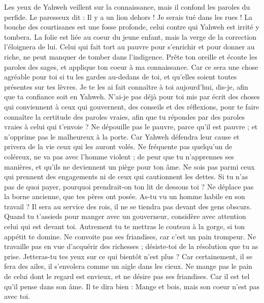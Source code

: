 \begin{multicols}{2}
Les yeux de Yahweh veillent sur la connaissance, mais il confond les paroles du perfide.
Le paresseux dit : Il y a un lion dehors ! Je serais tué dans les rues !
La bouche des courtisanes est une fosse profonde, celui contre qui Yahweh est irrité y tombera.
La folie est liée au coeur du jeune enfant, mais la verge de la correction l'éloignera de lui.
Celui qui fait tort au pauvre pour s'enrichir et pour donner au riche, ne peut manquer de tomber dans l'indigence.
Prête ton oreille et écoute les paroles des sages, et applique ton coeur à ma connaissance.
Car ce sera une chose agréable pour toi si tu les gardes au-dedans de toi, et qu'elles soient toutes présentes sur tes lèvres.
Je te les ai fait connaître à toi aujourd'hui, dis-je, afin que ta confiance soit en Yahweh.
N'ai-je pas déjà pour toi mis par écrit des choses qui conviennent à ceux qui gouvernent, des conseils et des réflexions,
pour te faire connaître la certitude des paroles vraies, afin que tu répondes par des paroles vraies à celui qui t'envoie ?
Ne dépouille pas le pauvre, parce qu'il est pauvre ; et n'opprime pas le malheureux à la porte.
Car Yahweh défendra leur cause et privera de la vie ceux qui les auront volés.
Ne fréquente pas quelqu'un de coléreux, ne va pas avec l'homme violent ;
de peur que tu n'apprennes ses manières, et qu'ils ne deviennent un piège pour ton âme.
Ne sois pas parmi ceux qui prennent des engagements ni de ceux qui cautionnent les dettes.
Si tu n'as pas de quoi payer, pourquoi prendrait-on ton lit de dessous toi ?
Ne déplace pas la borne ancienne, que tes pères ont posée.
As-tu vu un homme habile en son travail ? Il sera au service des rois, il ne se tiendra pas devant des gens obscurs.
\VerseOne{}Quand tu t'assieds pour manger avec un gouverneur, considère avec attention celui qui est devant toi.
Autrement tu te mettras le couteau à la gorge, si ton appétit te domine.
Ne convoite pas ses friandises, car c'est un pain trompeur.
Ne travaille pas en vue d'acquérir des richesses ; désiste-toi de la résolution que tu as prise.
Jetteras-tu tes yeux sur ce qui bientôt n'est plus ? Car certainement, il se fera des ailes, il s'envolera comme un aigle dans les cieux.
Ne mange pas le pain de celui dont le regard est envieux, et ne désire pas ses friandises.
Car il est tel qu'il pense dans son âme. Il te dira bien : Mange et bois, mais son coeur n'est pas avec toi.

\end{multicols}
